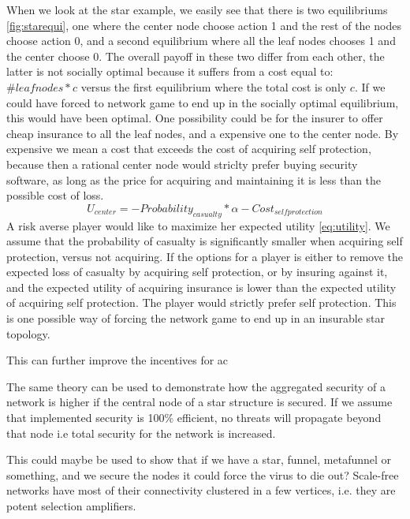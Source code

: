  When we look at the star example, we easily see that there is two equilibriums \ref{fig:starequi}, one where the center node choose action 1 and the rest of the nodes choose action 0, and a second equilibrium where all the leaf nodes chooses 1 and the center choose 0.
The overall payoff in these two differ from each other, the latter is not socially optimal because it
 suffers from a cost equal to: $\#leaf nodes*c$ versus the first equilibrium where the total cost is only $c$.
If we could have forced to network game to end up in the socially optimal equilibrium, this would have been optimal. 
One possibility could be for the insurer to offer cheap insurance to all the leaf nodes, and a expensive one to the center node. By expensive we mean a cost that exceeds the cost of acquiring self protection, because then a rational center node would striclty prefer buying security software, as long as the price for acquiring and maintaining it is less than the possible cost of loss.
\begin{equation}
 U_{center}=-Probability_{casualty}*\alpha-Cost_{selfprotection}
 \label{eq:utility}
 \end{equation} 
A risk averse player would like to maximize her expected utility \ref{eq:utility}. We assume that the probability of casualty is significantly smaller when acquiring self protection, versus not acquiring. If the options for a player is
 either to remove the expected loss of casualty by acquiring self protection, or by insuring against it,
and the expected utility of acquiring insurance is lower than the expected utility of acquiring self protection. The player would strictly prefer self protection. 
This is one possible way of forcing the network game to end up in an insurable star topology.

  
 
This can further improve the incentives for ac

The same theory can be used to demonstrate how the aggregated security of a network is higher if the central node of a star structure is secured. 
If we assume that implemented security is 100$\%$ efficient, no threats will propagate beyond that node i.e total security for the network is increased. 


 
This could maybe be used to show that if we have a star, funnel, metafunnel or something, and we secure the nodes it could force the virus to die out?
Scale-free networks have most of their connectivity clustered in a few vertices, i.e. they are potent selection amplifiers.

